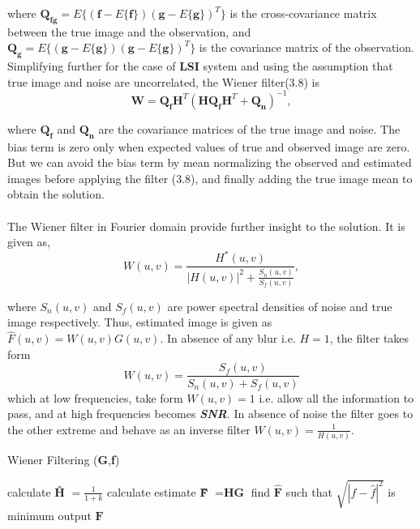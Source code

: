 \documentclass[a4paper]{book}
\begin{document}
where $ \textbf{Q}_{\textbf{fg}} = E\{(\textbf{f} - E\{\textbf{f}\})(\textbf{g}-E\{\textbf{g}\})^{T} \} $ is the cross-covariance matrix between the true image and the observation, and $ \textbf{Q}_{\textbf{g}} = E\{(\textbf{g} - E\{\textbf{g}\})(\textbf{g}-E\{\textbf{g}\})^{T} \} $ is the covariance matrix of the observation. Simplifying further for the case of \textbf{LSI} system and using the assumption that true image and noise are uncorrelated, the Wiener filter(3.8) is 
\begin{equation}
\label{eq3.9}
\textbf{W} = \textbf{Q}_{\textbf{f}}\textbf{H}^{T}(\textbf{H}\textbf{Q}_{\textbf{f}}\textbf{H}^{T} + \textbf{Q}_{\textbf{n}})^{-1},
\end{equation}

where $ \textbf{Q}_{\textbf{f}} $ and $ \textbf{Q}_{\textbf{n}} $ are the covariance matrices of the true image and noise. The bias term is zero only when expected values of true and observed image are zero. But we can avoid the bias term by mean normalizing the observed and estimated images before applying the filter (3.8), and finally adding the true image mean to obtain the solution.
\paragraph*{} The Wiener filter in Fourier domain provide further insight to the solution. It is given as,
\begin{equation}
\label{eq3.10}
	W(u,v) = \frac{H^{*}(u,v)}{|H(u,v)|^{2}+\frac{S_{n}(u,v)}{S_{f}(u,v)}},
\end{equation}

where $ S_{n}(u,v) $ and $ S_{f}(u,v) $ are power spectral densities of noise and true image respectively. Thus, estimated image is given as $\hat{F}(u,v) = W(u,v)G(u,v)$. In absence of any blur i.e. $ H = 1 $, the filter takes form 
\begin{equation}
\label{eq3.11}
	W(u,v) = \frac{S_{f}(u,v)}{S_{n}(u,v) + S_{f}(u,v)}
\end{equation}
which at low frequencies, take form $ W(u,v) = 1 $ i.e. allow all the information to pass, and at high frequencies becomes \textbf{\textit{SNR}}. 
In absence of noise the filter goes to the other extreme and behave as an inverse filter $ W(u,v) = \frac{1}{H(u,v)} $.
\bigskip
\begin{algorithm}[]
	\caption{Wiener Filtering (\textbf{G},\textbf{f})}
	\label{alg3}
	\begin{algorithmic}
			\STATE calculate \textbf{\^H} $ =  \frac{1}{1+k} $
			\STATE calculate estimate \textbf{\^F} $ = \textbf{HG} $ 
			\STATE find $ \hat{\textbf{F}} $ such that $ \sqrt{|f - \hat{f}|^{2}} $ is minimum
			\STATE output $\textbf{\^F} $
		\ENDFOR	
	\end{algorithmic}
\end{algorithm}
\newpage
\end{document}
